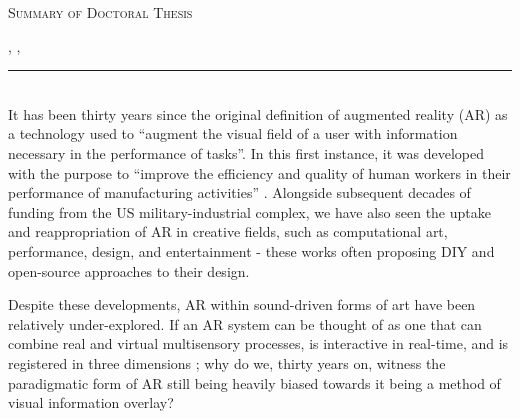 
\thispagestyle{empty}


    \noindent\Large \textsc{Summary of Doctoral Thesis}\par
    \noindent\Large \textsc\myTitle \par %
    \noindent\normalsize \textsc\mySubtitle \par
    
	\noindent\normalsize \textsc\myName, \textsc\myCenter, \textsc\myUni \par %

    \noindent\rule{\textwidth}{1pt}\\
    \noindent It has been thirty years since the original definition of augmented reality (AR) as a technology used to ``augment the visual field of a user with information necessary in the performance of tasks''. In this first instance, it was developed with the purpose to ``improve the efficiency and quality of human workers in their performance of manufacturing activities'' \citep{caudell1992}. Alongside subsequent decades of funding from the US military-industrial complex, we have also seen the uptake and reappropriation of AR in creative fields, such as computational art, performance, design, and entertainment - these works often proposing DIY and open-source approaches to their design. 
    
    \noindent Despite these developments, AR within sound-driven forms of art have been relatively under-explored. If an AR system can be thought of as one that can combine real and virtual multisensory processes, is interactive in real-time, and is registered in three dimensions \citep{azuma1997}; why do we, thirty years on, witness the paradigmatic form of AR still being heavily biased \citep{billinghurst2015} towards it being a method of visual information overlay?
    
